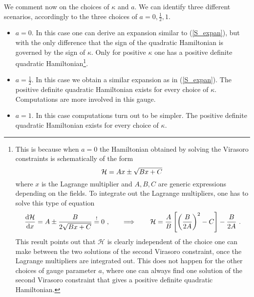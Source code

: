 \documentclass[12pt]{article}
\def\dd{\text{d}}
\numberwithin{equation}{section}
\begin{document}
We comment now on the choices of $\kappa$ and $a$.  We can identify three different scenarios, accordingly to the three choices of $a = 0, \frac{1}{2}, 1$.  
\begin{itemize}
\item  {\boldmath$a=0$}.  In this case one can derive an expansion similar to (\ref{S_expan}), but with the only difference that the sign of the quadratic Hamiltonian is governed by the sign of $\kappa$.  Only for positive $\kappa$ one has a positive definite quadratic Hamiltonian\footnote{This is because when $a=0$ the Hamiltonian obtained by solving the Virasoro constraints is schematically of the form 
\begin{equation}
\notag
\mathcal{H} = A x \pm \sqrt{B x + C}\, 
\end{equation}
where $x$ is the Lagrange multiplier and $A, B, C$ are generic expressions depending on the fields.  To integrate out the Lagrange multipliers, one has to solve this type of equation 
\begin{equation}
\notag
\frac{\dd \mathcal{H} }{\dd x} = A \pm \frac{B}{2 \sqrt{B x + C}} \overset{!}{=} 0 \ , \qquad \Longrightarrow \qquad
\mathcal{H} = \frac{A}{B} \left[\left(\frac{B}{2A}\right)^2 - C \right] - \frac{B}{2 A} \ .
\end{equation} 
This result points out that $\mathcal{H}$ is clearly independent of the choice one can make between the two solutions of the second Virasoro constraint, once the Lagrange multipliers are integrated out.  This does not happen for the other choices of gauge parameter $a$, where one can always find one solution of the second Virasoro constraint that gives a positive definite quadratic Hamiltonian.}. 
\item {\boldmath$a=\frac{1}{2}$}.  In this case we obtain a similar expansion as in (\ref{S_expan}). The positive definite quadratic Hamiltonian exists for every choice of $\kappa$.  Computations are more involved in this gauge.
\item {\boldmath$a=1$}. In this case computations turn out to be simpler. The positive definite quadratic Hamiltonian exists for every choice of $\kappa$.  
\end{itemize}
\end{document}
